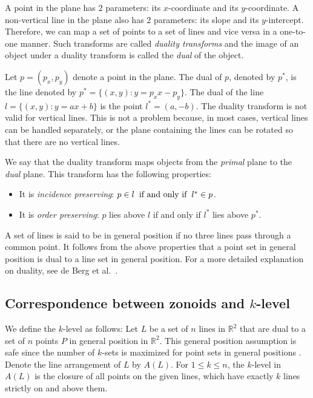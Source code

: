 \documentclass[charterfonts,lotsofwhite]{patmorin}
\begin{document}
A point in the plane has $2$ parameters: its $x$-coordinate and its
$y$-coordinate. A non-vertical line in the plane also has $2$
parameters: its slope and its $y$-intercept. Therefore, we can map a
set of points to a set of lines and vice versa in a one-to-one manner.
Such transforms are called \emph{duality transforms} and the image of
an object under a duality transform is called the \emph{dual} of the
object. 

Let $p = (p_x, p_y)$ denote a point in the plane. The dual of $p$,
denoted by $p^*$, is the line denoted by $p^* = \{(x,y) : y = p_xx -
p_y\}$. The dual of the line $l = \{(x,y) : y = ax + b\}$ is the point
$l^* = (a,-b)$.  The duality transform is not valid for vertical
lines. This is not a problem because, in most cases, vertical lines
can be handled separately, or the plane containing the lines can be
rotated so that there are no vertical lines. 

We say that the duality transform maps objects from the \emph{primal}
plane to the \emph{dual} plane. This transform has the following
properties:

\begin{itemize}
\item It is \emph{incidence preserving}: $p \in l \hspace{2mm} \mbox{if and only if} \hspace{2mm} l^* \in p$.
\item It is \emph{order preserving}: $p$ lies above $l$ if and only if $l^*$ lies above $p^*$.
\end{itemize}

A set of lines is said to be in general position if no three lines
pass through a common point.  It follows from the above properties
that a point set in general position is dual to a line set in general
position. For a more detailed explanation on duality, see de Berg et
al.\ \cite{cg_text}.

\subsection{Correspondence between zonoids and $k$-level}\label{subsection_correspondence_between_zonoids_and_klevel}

We define the $k$-level as follows: Let $L$ be a set of $n$ lines in $\mathbb{R}^2$ that are dual to a set of $n$ points $P$ in general position in $\mathbb{R}^2$. This general position assumption is safe since the number of $k$-sets is maximized for point sets in general positions \cite{improved_bounds_on_planar_ksets_and_klevels}. Denote the line arrangement of $L$ by $A(L)$. For $1 \le k \le n$, the $k$-level in $A(L)$ is the closure of all points on the given lines, which have exactly $k$ lines strictly on and above them. 
\end{document}
